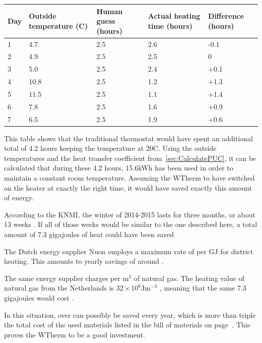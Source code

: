 \documentclass[12pt,a4paper,final]{report}
\begin{document}
\begingroup
	\setlength{\LTleft}{-20cm plus -1fill}
	\setlength{\LTright}{\LTleft}
    \begin{longtable}{ | p{1.0cm} | p{3cm} | p{3cm} | p{3cm} | p{2cm} |}
    \hline
    Day & Outside temperature (\degree{}C) & Human guess (hours) & Actual heating time (hours) & Difference (hours) \\ 
    \hline
    1 & 4.7 & 2.5 & 2.6 & -0.1\\ 
    \hline
    2 & 4.9 & 2.5 & 2.5 & 0\\
    \hline
    3 & 5.0 & 2.5 & 2.4 & +0.1\\
    \hline
    4 & 10.8 & 2.5 & 1.2 & +1.3\\
    \hline
    5 & 11.5 & 2.5 & 1.1 & +1.4\\
    \hline
    6 & 7.8 & 2.5 & 1.6 & +0.9\\
    \hline
    7 & 6.5 & 2.5 & 1.9 & +0.6\\
    \hline 
    \end{longtable}
\endgroup


This table shows that the traditional thermostat would have spent an additional total of 4.2 hours keeping the temperature at 20\degree{}C. Using the outside temperatures and the heat transfer coefficient from~\ref{sec:CalculatePUC}, it can be calculated that during these 4.2 hours, 15.6kWh has been used in order to maintain a constant room temperature. Assuming the WTherm to have switched on the heater at exactly the right time, it would have saved exactly this amount of energy. 

According to the KNMI, the winter of 2014-2015 lasts for three months, or about 
13 weeks \cite{KNMIseizoensdata}. If all of those weeks would be similar to the one described here, a total amount of 7.3 gigajoules of heat could have been saved

The Dutch energy supplier Nuon employs a maximum rate of  per GJ for district heating\cite{NuonStadsverwarming}. This amounts to yearly savings of around .

The same energy supplier charges  per $\mathrm{m^{3}}$ of natural gas\cite{NuonGas}. The heating value of natural gas from the Netherlands is $\mathrm{32\times 10^{6} Jm^{-3}}$ \cite{BinasHeatingValue}, meaning that the same 7.3 gigajoules would cost .

In this situation, over  can possibly be saved every year, which is more than triple the total cost of the used materials listed in the bill of materials on page~\pageref{chap:BOM}. This proves the WTherm to be a good investment.
\end{document}
